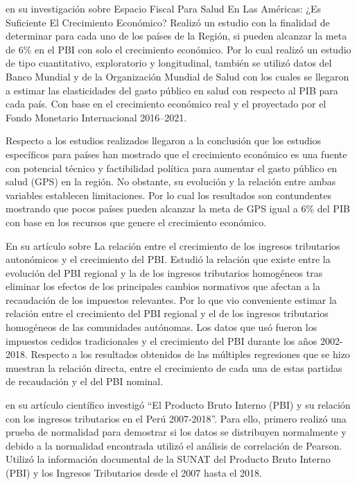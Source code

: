 \documentclass[
  letterpaper,
  DIV=11,
  numbers=noendperiod]{scrartcl}
\begin{document}
\textcite{cid_pedraza_espacio_2018} en su investigación sobre Espacio
Fiscal Para Salud En Las Américas: ¿Es Suficiente El Crecimiento
Económico? Realizó un estudio con la finalidad de determinar para cada
uno de los países de la Región, si pueden alcanzar la meta de 6\% en el
PBI con solo el crecimiento económico. Por lo cual realizó un estudio de
tipo cuantitativo, exploratorio y longitudinal, también se utilizó datos
del Banco Mundial y de la Organización Mundial de Salud con los cuales
se llegaron a estimar las elasticidades del gasto público en salud con
respecto al PIB para cada país. Con base en el crecimiento económico
real y el proyectado por el Fondo Monetario Internacional 2016--2021.

Respecto a los estudios realizados llegaron a la conclusión que los
estudios específicos para países han mostrado que el crecimiento
económico es una fuente con potencial técnico y factibilidad política
para aumentar el gasto público en salud (GPS) en la región. No obstante,
su evolución y la relación entre ambas variables establecen
limitaciones. Por lo cual los resultados son contundentes mostrando que
pocos países pueden alcanzar la meta de GPS igual a 6\% del PIB con base
en los recursos que genere el crecimiento económico.

\textcite{de_la_fuente_relacion_2021} En su artículo sobre La relación
entre el crecimiento de los ingresos tributarios autonómicos y el
crecimiento del PBI. Estudió la relación que existe entre la evolución
del PBI regional y la de los ingresos tributarios homogéneos tras
eliminar los efectos de los principales cambios normativos que afectan a
la recaudación de los impuestos relevantes. Por lo que vio conveniente
estimar la relación entre el crecimiento del PBI regional y el de los
ingresos tributarios homogéneos de las comunidades autónomas. Los datos
que usó fueron los impuestos cedidos tradicionales y el crecimiento del
PBI durante los años 2002-2018. Respecto a los resultados obtenidos de
las múltiples regresiones que se hizo muestran la relación directa,
entre el crecimiento de cada una de estas partidas de recaudación y el
del PBI nominal.

\textcite{fernandez_producto_2019} en su artículo científico investigó
``El Producto Bruto Interno (PBI) y su relación con los ingresos
tributarios en el Perú 2007-2018''. Para ello, primero realizó una
prueba de normalidad para demostrar si los datos se distribuyen
normalmente y debido a la normalidad encontrada utilizó el análisis de
correlación de Pearson. Utilizó la información documental de la SUNAT
del Producto Bruto Interno (PBI) y los Ingresos Tributarios desde el
2007 hasta el 2018.
\end{document}
